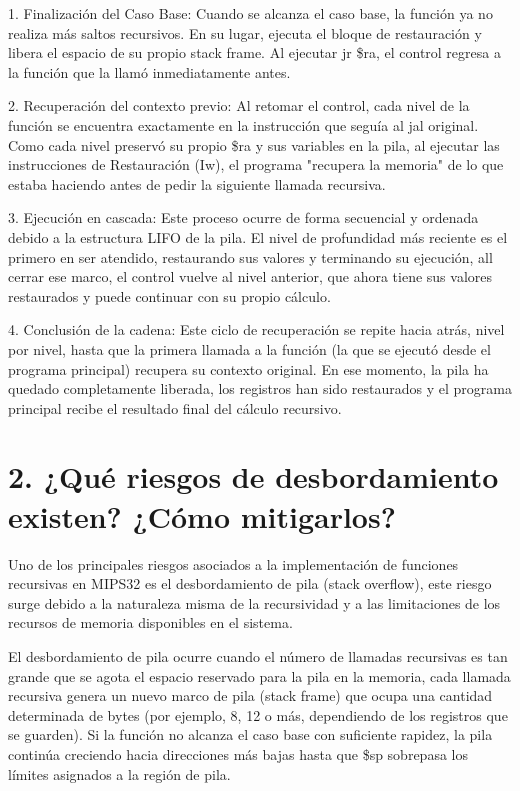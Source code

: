 \documentclass[12pt, letterpaper]{article}
\begin{document}
1. Finalización del Caso Base: Cuando se alcanza el caso base, la función ya no realiza más saltos recursivos. En su lugar, ejecuta el bloque de restauración y libera el espacio de su propio stack frame. Al ejecutar jr \$ra, el control regresa a la función que la llamó inmediatamente antes.

2. Recuperación del contexto previo: Al retomar el control, cada nivel de la función se encuentra exactamente en la instrucción que seguía al jal original. Como cada nivel preservó su propio \$ra y sus variables en la pila, al ejecutar las instrucciones de Restauración (Iw), el programa "recupera la memoria" de lo que estaba haciendo antes de pedir la siguiente llamada recursiva.

3. Ejecución en cascada: Este proceso ocurre de forma secuencial y ordenada debido a la estructura LIFO de la pila. El nivel de profundidad más reciente es el primero en ser atendido, restaurando sus valores y terminando su ejecución, all cerrar ese marco, el control vuelve al nivel anterior, que ahora tiene sus valores restaurados y puede continuar con su propio cálculo.

4. Conclusión de la cadena: Este ciclo de recuperación se repite hacia atrás, nivel por nivel, hasta que la primera llamada a la función (la que se ejecutó desde el programa principal) recupera su contexto original. En ese momento, la pila ha quedado completamente liberada, los registros han sido restaurados y el programa principal recibe el resultado final del cálculo recursivo.

\newpage
\section*{2. ¿Qué riesgos de desbordamiento existen? ¿Cómo mitigarlos?}

Uno de los principales riesgos asociados a la implementación de funciones recursivas en MIPS32 es el desbordamiento de pila (stack overflow), este riesgo surge debido a la naturaleza misma de la recursividad y a las limitaciones de los recursos de memoria disponibles en el sistema.

El desbordamiento de pila ocurre cuando el número de llamadas recursivas es tan grande que se agota el espacio reservado para la pila en la memoria, cada llamada recursiva genera un nuevo marco de pila (stack frame) que ocupa una cantidad determinada de bytes (por ejemplo, 8, 12 o más, dependiendo de los registros que se guarden). Si la función no alcanza el caso base con suficiente rapidez, la pila continúa creciendo hacia direcciones más bajas hasta que \$sp sobrepasa los límites asignados a la región de pila.
\end{document}
